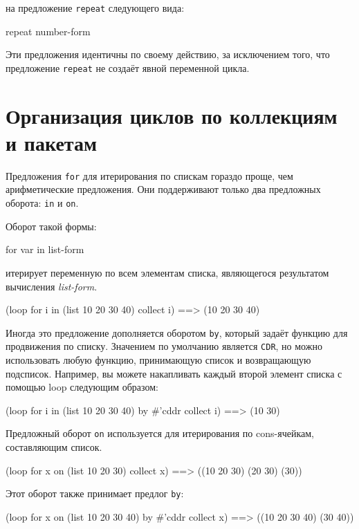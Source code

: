 \noindent{}на предложение \lstinline{repeat} следующего вида:

\begin{myverb}
repeat number-form
\end{myverb}

Эти предложения идентичны по своему действию, за исключением того, что предложение
\lstinline{repeat} не создаёт явной переменной цикла.

\section{Организация циклов по коллекциям и пакетам}


Предложения \lstinline{for} для итерирования по спискам гораздо проще, чем арифметические
предложения. Они поддерживают только два предложных оборота: \lstinline{in} и \lstinline{on}.

Оборот такой формы:

\begin{myverb}
for var in list-form
\end{myverb}

\noindent{}итерирует переменную по всем элементам списка, являющегося результатом вычисления
\textit{list-form}.

\begin{myverb}
(loop for i in (list 10 20 30 40) collect i) ==> (10 20 30 40)
\end{myverb}

Иногда это предложение дополняется оборотом \lstinline{by}, который задаёт функцию для
продвижения по списку. Значением по умолчанию является \lstinline{CDR}, но можно использовать
любую функцию, принимающую список и возвращающую подсписок. Например, вы можете
накапливать каждый второй элемент списка с помощью loop следующим образом:

\begin{myverb}
(loop for i in (list 10 20 30 40) by #'cddr collect i) ==> (10 30)
\end{myverb}

Предложный оборот \lstinline{on} используется для итерирования по cons-ячейкам, сос\-тав\-ляю\-щим
список.

\begin{myverb}
(loop for x on (list 10 20 30) collect x) ==> ((10 20 30) (20 30) (30))
\end{myverb}

Этот оборот также принимает предлог \lstinline{by}:

\begin{myverb}
(loop for x on (list 10 20 30 40) by #'cddr collect x) ==> ((10 20 30 40) (30 40))
\end{myverb}

